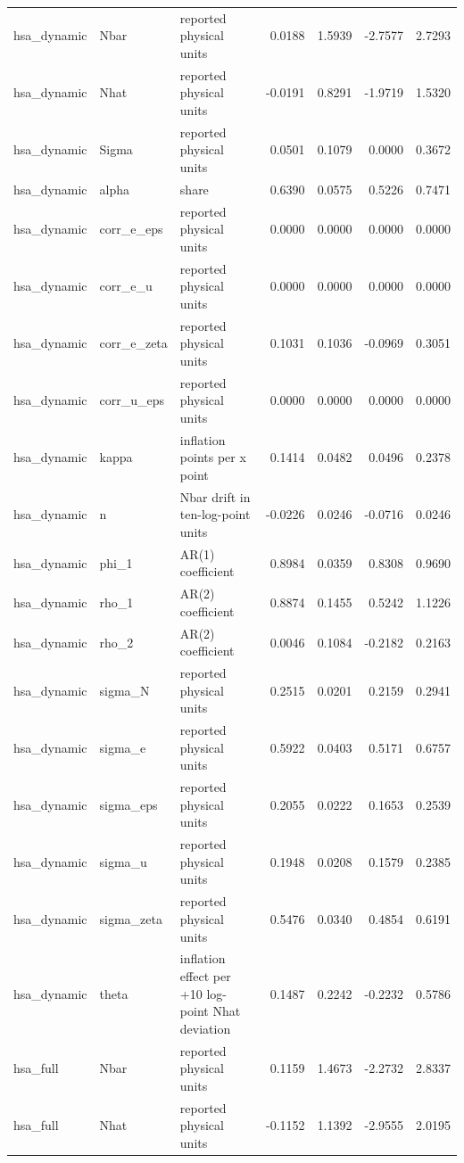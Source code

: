 \begin{tabular}{lllrrrr}
hsa\_dynamic & Nbar & reported physical units & 0.0188 & 1.5939 & -2.7577 & 2.7293 \\
hsa\_dynamic & Nhat & reported physical units & -0.0191 & 0.8291 & -1.9719 & 1.5320 \\
hsa\_dynamic & Sigma & reported physical units & 0.0501 & 0.1079 & 0.0000 & 0.3672 \\
hsa\_dynamic & alpha & share & 0.6390 & 0.0575 & 0.5226 & 0.7471 \\
hsa\_dynamic & corr\_e\_eps & reported physical units & 0.0000 & 0.0000 & 0.0000 & 0.0000 \\
hsa\_dynamic & corr\_e\_u & reported physical units & 0.0000 & 0.0000 & 0.0000 & 0.0000 \\
hsa\_dynamic & corr\_e\_zeta & reported physical units & 0.1031 & 0.1036 & -0.0969 & 0.3051 \\
hsa\_dynamic & corr\_u\_eps & reported physical units & 0.0000 & 0.0000 & 0.0000 & 0.0000 \\
hsa\_dynamic & kappa & inflation points per x point & 0.1414 & 0.0482 & 0.0496 & 0.2378 \\
hsa\_dynamic & n & Nbar drift in ten-log-point units & -0.0226 & 0.0246 & -0.0716 & 0.0246 \\
hsa\_dynamic & phi\_1 & AR(1) coefficient & 0.8984 & 0.0359 & 0.8308 & 0.9690 \\
hsa\_dynamic & rho\_1 & AR(2) coefficient & 0.8874 & 0.1455 & 0.5242 & 1.1226 \\
hsa\_dynamic & rho\_2 & AR(2) coefficient & 0.0046 & 0.1084 & -0.2182 & 0.2163 \\
hsa\_dynamic & sigma\_N & reported physical units & 0.2515 & 0.0201 & 0.2159 & 0.2941 \\
hsa\_dynamic & sigma\_e & reported physical units & 0.5922 & 0.0403 & 0.5171 & 0.6757 \\
hsa\_dynamic & sigma\_eps & reported physical units & 0.2055 & 0.0222 & 0.1653 & 0.2539 \\
hsa\_dynamic & sigma\_u & reported physical units & 0.1948 & 0.0208 & 0.1579 & 0.2385 \\
hsa\_dynamic & sigma\_zeta & reported physical units & 0.5476 & 0.0340 & 0.4854 & 0.6191 \\
hsa\_dynamic & theta & inflation effect per +10 log-point Nhat deviation & 0.1487 & 0.2242 & -0.2232 & 0.5786 \\
hsa\_full & Nbar & reported physical units & 0.1159 & 1.4673 & -2.2732 & 2.8337 \\
hsa\_full & Nhat & reported physical units & -0.1152 & 1.1392 & -2.9555 & 2.0195 \\

\end{tabular}
